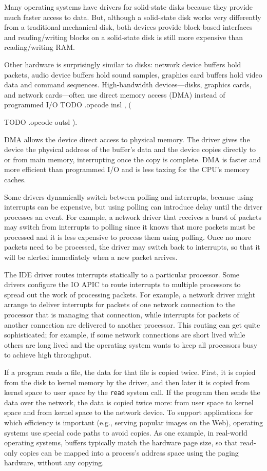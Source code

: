 Many operating systems have drivers for solid-state disks because they provide
much faster access to data.  But, although a solid-state disk works very differently
from a traditional mechanical disk, both devices provide block-based interfaces
and reading/writing blocks on a solid-state disk is still more expensive than
reading/writing RAM.

Other hardware is surprisingly similar to disks: network device buffers
hold packets, audio device buffers hold sound samples, graphics card
buffers hold video data and command sequences.
High-bandwidth devices—disks, graphics cards, and network cards—often use
direct memory access (DMA) instead of programmed I/O
TODO .opcode insl , (

TODO .opcode outsl ).

DMA allows the device direct access to physical memory.
The driver gives the device the physical address of the buffer's data and
the device copies directly to or from main memory,
interrupting once the copy is complete.
DMA is faster and more efficient than programmed I/O
and is less taxing for the CPU's memory caches.

Some drivers dynamically switch between polling and interrupts, because using
interrupts can be expensive, but using polling can introduce delay until the
driver processes an event.  For example, a network driver that receives a
burst of packets may switch from interrupts to polling since it knows that more
packets must be processed and it is less expensive to process them using polling.
Once no more packets need to be processed, the driver may switch back to
interrupts, so that it will be alerted immediately when a new packet arrives.

The IDE driver routes interrupts statically to a particular processor.  Some
drivers configure the IO APIC
to route interrupts to multiple processors to spread out
the work of processing packets.
For example, a network driver might arrange to deliver interrupts
for packets of one network connection to the processor that is managing that
connection, while interrupts for packets of another connection are delivered to
another processor.  This routing can get quite sophisticated; for example, if
some network connections are short lived while others are long lived and the
operating system wants to keep all processors busy to achieve high throughput.

If a program reads a file, the data for that file is copied twice.  First, it
is copied from the disk to kernel memory by the driver, and then later it is
copied from kernel space to user space by the 
\lstinline{read}
system call.  If the program then sends the data over the network, 
the data is copied twice more: from user space to kernel space and from
kernel space to the network device.  To support applications for which 
efficiency is important (e.g., serving popular images on the Web), operating systems
use special code paths to avoid copies.  As one example,
in real-world operating systems, 
buffers typically match the hardware page size, so that
read-only copies can be mapped into a process's address space
using the paging hardware, without any copying.

